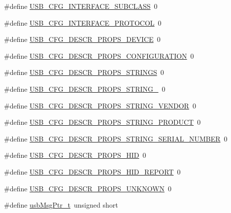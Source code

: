 \begin{DoxyCompactItemize}
\item 
\#define \hyperlink{usbconfig-prototype_8h_ac643f27afa43062c19b8f0674b6be1b5}{U\-S\-B\-\_\-\-C\-F\-G\-\_\-\-I\-N\-T\-E\-R\-F\-A\-C\-E\-\_\-\-S\-U\-B\-C\-L\-A\-S\-S}~0
\item 
\#define \hyperlink{usbconfig-prototype_8h_a8ddab89b764bfd88d024c7d9c9931de3}{U\-S\-B\-\_\-\-C\-F\-G\-\_\-\-I\-N\-T\-E\-R\-F\-A\-C\-E\-\_\-\-P\-R\-O\-T\-O\-C\-O\-L}~0
\item 
\#define \hyperlink{usbconfig-prototype_8h_aa916bf33f6f8f481a219d0a81b5b225e}{U\-S\-B\-\_\-\-C\-F\-G\-\_\-\-D\-E\-S\-C\-R\-\_\-\-P\-R\-O\-P\-S\-\_\-\-D\-E\-V\-I\-C\-E}~0
\item 
\#define \hyperlink{usbconfig-prototype_8h_a8aae9f682ca9f91faae0453e4351a50b}{U\-S\-B\-\_\-\-C\-F\-G\-\_\-\-D\-E\-S\-C\-R\-\_\-\-P\-R\-O\-P\-S\-\_\-\-C\-O\-N\-F\-I\-G\-U\-R\-A\-T\-I\-O\-N}~0
\item 
\#define \hyperlink{usbconfig-prototype_8h_a750fb6cc3e8eafaddae659af97f6f737}{U\-S\-B\-\_\-\-C\-F\-G\-\_\-\-D\-E\-S\-C\-R\-\_\-\-P\-R\-O\-P\-S\-\_\-\-S\-T\-R\-I\-N\-G\-S}~0
\item 
\#define \hyperlink{usbconfig-prototype_8h_a9c0556a4c6c5a1ab8f6598aee8e5bf6a}{U\-S\-B\-\_\-\-C\-F\-G\-\_\-\-D\-E\-S\-C\-R\-\_\-\-P\-R\-O\-P\-S\-\_\-\-S\-T\-R\-I\-N\-G\-\_}~0
\item 
\#define \hyperlink{usbconfig-prototype_8h_a55edf2117128387162339d98ba2af0f4}{U\-S\-B\-\_\-\-C\-F\-G\-\_\-\-D\-E\-S\-C\-R\-\_\-\-P\-R\-O\-P\-S\-\_\-\-S\-T\-R\-I\-N\-G\-\_\-\-V\-E\-N\-D\-O\-R}~0
\item 
\#define \hyperlink{usbconfig-prototype_8h_aa08084f9755a643e02d469b66b129ef6}{U\-S\-B\-\_\-\-C\-F\-G\-\_\-\-D\-E\-S\-C\-R\-\_\-\-P\-R\-O\-P\-S\-\_\-\-S\-T\-R\-I\-N\-G\-\_\-\-P\-R\-O\-D\-U\-C\-T}~0
\item 
\#define \hyperlink{usbconfig-prototype_8h_a82224c07d3a1f9fcccbff70b71c8ea51}{U\-S\-B\-\_\-\-C\-F\-G\-\_\-\-D\-E\-S\-C\-R\-\_\-\-P\-R\-O\-P\-S\-\_\-\-S\-T\-R\-I\-N\-G\-\_\-\-S\-E\-R\-I\-A\-L\-\_\-\-N\-U\-M\-B\-E\-R}~0
\item 
\#define \hyperlink{usbconfig-prototype_8h_adfbd53b5310c36b1e4b06d6a3b992e8a}{U\-S\-B\-\_\-\-C\-F\-G\-\_\-\-D\-E\-S\-C\-R\-\_\-\-P\-R\-O\-P\-S\-\_\-\-H\-I\-D}~0
\item 
\#define \hyperlink{usbconfig-prototype_8h_a248eae427d6cea0046661eb8438b7198}{U\-S\-B\-\_\-\-C\-F\-G\-\_\-\-D\-E\-S\-C\-R\-\_\-\-P\-R\-O\-P\-S\-\_\-\-H\-I\-D\-\_\-\-R\-E\-P\-O\-R\-T}~0
\item 
\#define \hyperlink{usbconfig-prototype_8h_a3c9ed2d932cf0f5fc9788a91028a8b4b}{U\-S\-B\-\_\-\-C\-F\-G\-\_\-\-D\-E\-S\-C\-R\-\_\-\-P\-R\-O\-P\-S\-\_\-\-U\-N\-K\-N\-O\-W\-N}~0
\item 
\#define \hyperlink{usbconfig-prototype_8h_a3cf7590f40ccf343c258d7b1d1b3ebab}{usb\-Msg\-Ptr\-\_\-t}~unsigned short
\end{DoxyCompactItemize}


